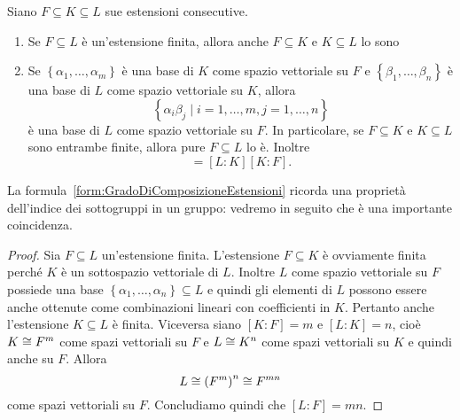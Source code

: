 \begin{prop}
Siano $F\subseteq K\subseteq L$ sue estensioni consecutive. 
\begin{enumerate}
\item Se $F\subseteq L$ è un'estensione finita, allora anche $F \subseteq K$ e $K\subseteq L$ lo sono
\item Se $\left\{\alpha_1, \dots{}, \alpha_m\right\}$ è una base di $K$ come spazio vettoriale su $F$ e $\left\{\beta_1, \dots{}, \beta_n\right\}$ è una base di $L$ come spazio vettoriale su $K$, allora
\[\left\{\alpha_i \beta_j \mid i = 1, \dots{}, m, j = 1,\dots{}, n \right\}\]
è una base di $L$ come spazio vettoriale su $F$. In particolare, se $F \subseteq K$ e $K\subseteq L$ sono entrambe finite, allora pure $F \subseteq L$ lo è. Inoltre
\begin{equation}
[L:F]=[L:K][K:F] .\label{form:GradoDiComposizioneEstensioni}
\end{equation}
\end{enumerate}
\end{prop}

La formula~\ref{form:GradoDiComposizioneEstensioni} ricorda una proprietà dell'indice dei sottogruppi in un gruppo: vedremo in seguito che è una importante coincidenza.

\begin{proof}
Sia $F \subseteq L$ un'estensione finita. L'estensione $F \subseteq K$ è ovviamente finita perché $K$ è un sottospazio vettoriale di $L$. Inoltre $L$ come spazio vettoriale su $F$ possiede una base $\left\{ \alpha_1, \dots{}, \alpha_n \right\} \subseteq L$ e quindi gli elementi di $L$ possono essere anche ottenute come combinazioni lineari con coefficienti in $K$. Pertanto anche l'estensione $K \subseteq L$ è finita.\newline
Viceversa  siano $[K:F]=m$ e $[L:K]=n$, cioè $K \cong F^m$ come spazi vettoriali su $F$ e $L \cong K^n$ come spazi vettoriali su $K$ e quindi anche su $F$. Allora 
\[L \cong \left(F^m\right)^n\cong F^{mn}\] 
come spazi vettoriali su $F$. Concludiamo quindi che $[L:F]=mn$.
\end{proof}


